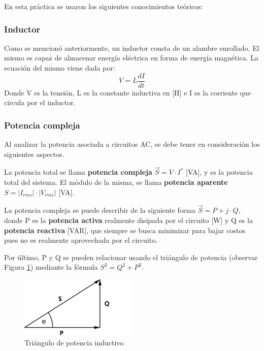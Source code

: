 \documentclass{article}
\begin{document}
        En esta práctica se usaron los siguientes conocimientos teóricos:

        \subsubsection{Inductor}

        Como se mencionó anteriormente, un inductor consta de un alambre enrollado. El mismo es capaz de almacenar energía eléctrica en forma de energía magnética.
         La ecuación del mismo viene dada por:
        \begin{equation*}
            V=L \frac{dI}{dt}
        \end{equation*}
        Donde V es la tensión, L es la constante inductiva en [H] e I es la corriente que circula por el inductor.

        \subsubsection{Potencia compleja}

        Al analizar la potencia asociada a circuitos AC, se debe tener en consideración los siguientes aspectos.\par
        La potencia total se llama { \bfseries potencia compleja} $\vec{S}= V \cdot I^{*}$ [VA], y es la potencia 
        total del sistema. El módulo de la misma, se llama {\bfseries potencia aparente} $S=|I_{rms}| \cdot |V_{rms}|$ 
        [VA]. \par
        La potencia compleja se puede describir de la siguiente forma $\vec{S}=P + j \cdot Q$, donde P es la { \bfseries 
        potencia activa} realmente disipada por el circuito [W] y Q es la {\bfseries potencia reactiva} [VAR], que siempre se busca minimizar para 
        bajar costos pues no es realmente aprovechada por el circuito. \par
        Por último, P y Q se pueden relacionar usando el triángulo de potencia (observar Figura \ref{fig:triangulo_de_potencia}) mediante la fórmula $S^2=Q^2+P^2$. 



        \begin{figure}[h!] %
            \centering
            \includegraphics[width=0.5\textwidth]{Trojkat-mocy.png} %
            \caption{Triángulo de potencia inductivo}
            \label{fig:triangulo_de_potencia} %
        \end{figure}
    
\end{document}

